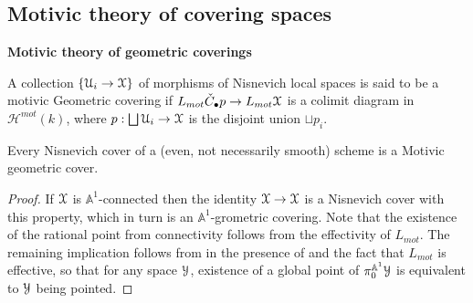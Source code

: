 \subsection{Motivic theory of covering spaces}

\textbf{Motivic theory of geometric coverings}
\begin{defn}
A collection $\{\EuScript{U}_i\to \EuScript{X}\}$ of morphisms of Nisnevich local spaces is said to be a motivic Geometric covering if $L_{mot}\check{C}_\bullet p\to L_{mot}\EuScript{X}$ is a colimit diagram in $\mathcal{H}^{mot}(k)$, where $p: \bigsqcup\EuScript{U}_i\to \EuScript{X}$ is the disjoint union $\sqcup p_i$.
\end{defn}
\begin{ex}
    Every Nisnevich cover of a (even, not necessarily smooth) scheme is a Motivic geometric cover.
\end{ex}
\begin{proof}
    If $\EuScript{X}$ is $\mathbb{A}^1$-connected then the identity $\EuScript{X}\to \EuScript{X}$ is a Nisnevich cover with this property, which in turn is an $\mathbb{A}^1$-grometric covering. Note that the existence of the rational point from connectivity follows from the effectivity of $L_{mot}$. The remaining implication follows from  in the presence of  and the fact that $L_{mot}$ is effective, so that for any space $\EuScript{Y}$, existence of a global point of $\pi_0^{\mathbb{A}^1}\EuScript{Y}$ is equivalent to $\EuScript{Y}$ being pointed. 
\end{proof}

